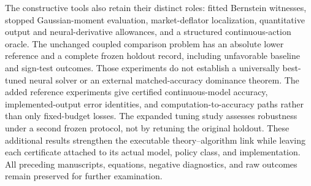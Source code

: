 The constructive tools also retain their distinct roles: fitted Bernstein witnesses, stopped Gaussian-moment evaluation, market-deflator localization, quantitative output and neural-derivative allowances, and a structured continuous-action oracle. The unchanged coupled comparison problem has an absolute lower reference and a complete frozen holdout record, including unfavorable baseline and sign-test outcomes. Those experiments do not establish a universally best-tuned neural solver or an external matched-accuracy dominance theorem. The added reference experiments give certified continuous-model accuracy, implemented-output error identities, and computation-to-accuracy paths rather than only fixed-budget losses. The expanded tuning study assesses robustness under a second frozen protocol, not by retuning the original holdout. These additional results strengthen the executable theory--algorithm link while leaving each certificate attached to its actual model, policy class, and implementation. All preceding manuscripts, equations, negative diagnostics, and raw outcomes remain preserved for further examination.
